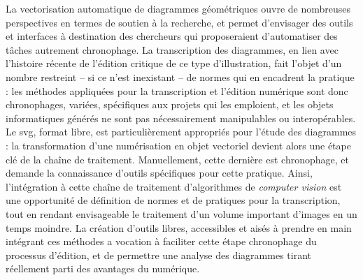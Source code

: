 \documentclass[a4paper,12pt,twoside]{book}
\newcommand{\cv}{\textit{computer vision}\xspace}
\newcommand{\svg}{\gls{svg}\xspace}
\newcommand{\clearemptydoublepage}{\newpage{\pagestyle{empty}\cleardoublepage}}
\begin{document}
        La vectorisation automatique de diagrammes géométriques ouvre de nombreuses perspectives en termes de soutien à la recherche, et permet d'envisager des outils et interfaces à destination des chercheurs qui proposeraient d'automatiser des tâches autrement chronophage. La transcription des diagrammes, en lien avec l'histoire récente de l'édition critique de ce type d'illustration, fait l'objet d'un nombre restreint -- si ce n'est inexistant -- de normes qui en encadrent la pratique : les méthodes appliquées pour la transcription et l'édition numérique sont donc chronophages, variées, spécifiques aux projets qui les emploient, et les objets informatiques générés ne sont pas nécessairement manipulables ou interopérables. Le \svg, format libre, est particulièrement appropriés pour l'étude des diagrammes : la transformation d'une numérisation en objet vectoriel devient alors une étape clé de la chaîne de traitement. Manuellement, cette dernière est chronophage, et demande la connaissance d'outils spécifiques pour cette pratique. Ainsi, l'intégration à cette chaîne de traitement d'algorithmes de \cv est une opportunité de définition de normes et de pratiques pour la transcription, tout en rendant envisageable le traitement d'un volume important d'images en un temps moindre. La création d'outils libres, accessibles et aisés à prendre en main intégrant ces méthodes a vocation à faciliter cette étape chronophage du processus d'édition, et de permettre une analyse des diagrammes tirant réellement parti des avantages du numérique.    
        \clearemptydoublepage
        
\end{document}
